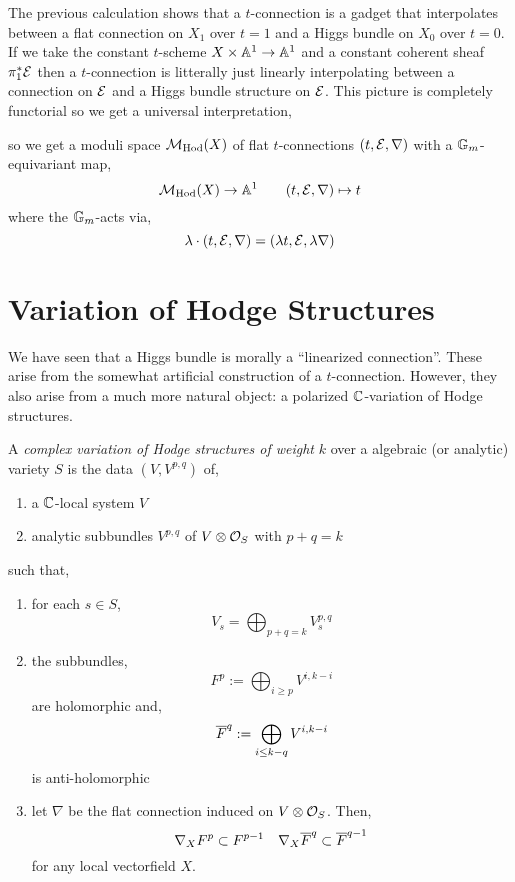 \documentclass[12pt]{article}
\begin{document}
The previous calculation shows that a $t$-connection is a gadget that interpolates between a flat connection on $X_1$ over $t = 1$ and a Higgs bundle on $X_0$ over $t = 0$. If we take the constant $t$-scheme $X \times \mathbb{A}^1 \to \mathbb{A}^1$ and a constant coherent sheaf $\pi_1^* \mathcal{E}$ then a $t$-connection is litterally just linearly interpolating between a connection on $\mathcal{E}$ and a Higgs bundle structure on $\mathcal{E}$. This picture is completely functorial so we get a universal interpretation,
\begin{center}
\end{center}
so we get a moduli space $\mathcal{M}_{\mathrm{Hod}}(X)$ of flat $t$-connections $(t, \mathcal{E}, \nabla)$ with a ${\mathbb{G}_m}$-equivariant map,
\[ \mathcal{M}_{\text{Hod}}(X) \to \mathbb{A}^1 \quad \quad (t, \mathcal{E}, \nabla) \mapsto t \]
where the ${\mathbb{G}_m}$-acts via,
\[ \lambda \cdot (t, \mathcal{E}, \nabla) = (\lambda t, \mathcal{E}, \lambda \nabla) \]

\section{Variation of Hodge Structures}

We have seen that a Higgs bundle is morally a ``linearized connection''. These arise from the somewhat artificial construction of a $t$-connection. However, they also arise from a much more natural object: a polarized $\mathbb{C}$-variation of Hodge structures. 

\begin{defn}
A \textit{complex variation of Hodge structures of weight} $k$ over a algebraic (or analytic) variety $S$ is the data $(V, V^{p,q})$ of,
\begin{enumerate}
\item a $\mathbb{C}$-local system $V$
\item analytic subbundles $V^{p,q}$ of $V \otimes \mathcal{O}_{S}$ with $p + q = k$
\end{enumerate}
such that,
\begin{enumerate}
\item for each $s \in S$,
\[ V_s = \bigoplus_{p+q=k} V^{p,q}_s \]
\item the subbundles,
\[ F^p := \bigoplus_{i \ge p} V^{i, k - i} \]
are holomorphic and,
\[ \overline{F}^q := \bigoplus_{i \le k-q} V^{i, k-i} \]
is anti-holomorphic
\item let $\nabla$ be the flat connection induced on $V \otimes \mathcal{O}_{S}$. Then,
\[ \nabla_X F^p \subset F^{p-1} \quad \nabla_X \overline{F}^q \subset \overline{F}^{q-1} \]
for any local vectorfield $X$. 
\end{enumerate}
\end{defn}
\end{document}
